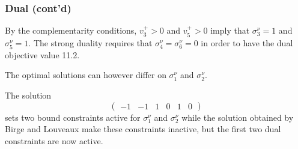 \documentclass{beamer}
\begin{document}



\begin{frame}
\frametitle{Dual (cont'd)}	

By the complementarity conditions, $v_3^+ > 0$ and $v_5^+ > 0$ imply that $\sigma_3^{\nu} = 1$ and $\sigma_5^{\nu} = 1$. %
The strong duality requires that $\sigma_4^{\nu} = \sigma_6^{\nu} = 0$ in order to have the dual objective value 11.2.

\mbox{}

The optimal solutions can however differ on $\sigma_1^{\nu}$ and $\sigma_2^{\nu}$. %

\mbox{}


The solution
\[
\begin{pmatrix} -1 & -1 & 1 & 0 & 1 & 0 \end{pmatrix}
\]
sets two bound constraints active for $\sigma_1^{\nu}$ and $\sigma_2^{\nu}$
while the solution obtained by Birge and Louveaux make these constraints inactive, but the first two dual constraints are now active.

\end{frame}
\end{document}
